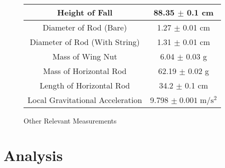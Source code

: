 \documentclass[11pt]{article}
\begin{document}
\begin{figure}[h]
	\centering
	\caption{Other Relevant Measurements}
	\begin{tabular}{|c|c|}
		\hline
		Height of Fall & 88.35 \(\pm\) 0.1 cm \\
		\hline
		Diameter of Rod (Bare) & 1.27 \(\pm\) 0.01 cm \\
		\hline
		Diameter of Rod (With String) & 1.31 \(\pm\) 0.01 cm \\
		\hline
		Mass of Wing Nut & 6.04 \(\pm\) 0.03 g \\
		\hline
		Mass of Horizontal Rod & 62.19 \(\pm\) 0.02 g \\
		\hline
		Length of Horizontal Rod & 34.2 \(\pm\) 0.1 cm \\
		\hline       
		Local Gravitational Acceleration & 9.798 \( \pm \; 0.001 \; \textrm{m}/\textrm{s}^2 \)
		\\
		\hline
	\end{tabular}
\end{figure}
\section{Analysis}
\end{document}
